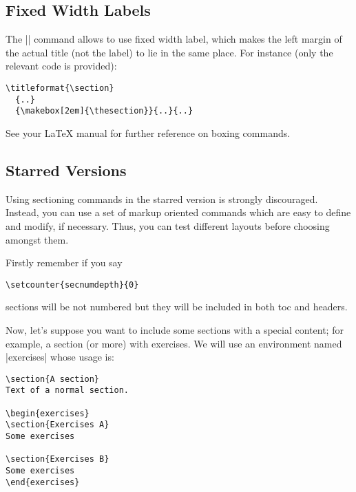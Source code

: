 \documentclass[a4paper]{ltxguide}
\begin{document}
\subsection{Fixed Width Labels}

The |\makebox| command allows to use fixed width label, which
makes the left margin of the actual title (not the label) to lie
in the same place. For instance (only the relevant code is
provided):
\begin{verbatim}
\titleformat{\section}
  {..}
  {\makebox[2em]{\thesection}}{..}{..}
\end{verbatim}

See your \LaTeX{} manual for further reference on boxing commands.

\subsection{Starred Versions}
\label{s:starred}

Using sectioning commands in the starred version is strongly 
discouraged.  Instead, you can use a set of markup oriented commands 
which are easy to define and modify, if necessary.  Thus, you can test 
different layouts before choosing amongst them.

Firstly remember if you say
\begin{verbatim}
\setcounter{secnumdepth}{0}
\end{verbatim}
sections will be not numbered but they will be included in both toc
and headers.

Now, let's
suppose you want to include some sections with a special content;
for example, a section (or more) with exercises. We will use an
environment named |exercises| whose usage is:
\begin{verbatim}
\section{A section}
Text of a normal section.

\begin{exercises}
\section{Exercises A}
Some exercises

\section{Exercises B}
Some exercises
\end{exercises}
\end{verbatim}
\end{document}
